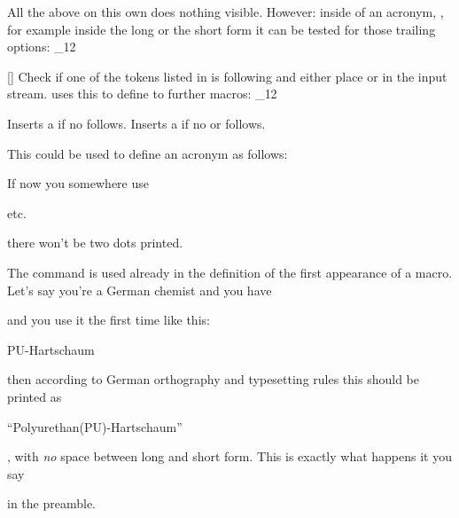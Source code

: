 \documentclass[load-preamble+,scrartcl={DIV10}]{cnltx-doc}
\makeatletter
\renewenvironment{commands}
  {%
    \cnltx@set@catcode_{12}%
    \let\command\cnltx@command
    \cnltxlist
  }
  {\endcnltxlist}
\makeatother
\begin{document}
All the above on this own does nothing visible. However: inside of an acronym,
\ie, for example inside the long or the short form it can be tested for those
trailing options:
\begin{commands}
  \command{aciftrailing}[]
    Check if one of the tokens listed in  is
    following and either place  or  in the input
    stream.
\end{commands}
\acro uses this to define to further macros:
\begin{commands}
  \command{acdot} Inserts a  if no  follows.
  \command{acspace} Inserts a  if no  or
     follows.
\end{commands}
\begin{sourcecode}
  \newcommand*\acdot{\aciftrailing{dot}{}{.}}
  \newcommand*\acspace{\aciftrailing{dash,babel-hyphen}{}{\space}}
\end{sourcecode}

This could be used to define an acronym as follows:
\begin{sourcecode}
\end{sourcecode}
If now you somewhere use
\begin{sourcecode}
  \ac{etc}.
\end{sourcecode}
there won't be two dots printed.

The command  is used already in the definition of the first
appearance of a macro.  Let's say you're a German chemist and you have
\begin{sourcecode}
\end{sourcecode}
and you use it the first time like this:
\begin{sourcecode}
  \ac{PU}-Hartschaum
\end{sourcecode}
then according to German orthography and typesetting rules this should be
printed as
\begin{center}
  \enquote{Polyurethan(PU)-Hartschaum}
\end{center}
\ie, with \emph{no} space between long and short form.  This is exactly what
happens it you say
\begin{sourcecode}
\end{sourcecode}
in the preamble.
\end{document}
